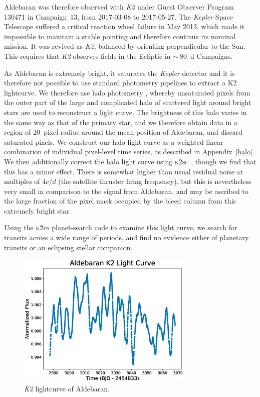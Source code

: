\documentclass[modern]{aastex61}
\newcommand{\kepler}{\emph{Kepler}\xspace}
\newcommand{\ktwo}{\emph{K2}\xspace}
\begin{document}
Aldebaran was therefore observed with \ktwo under Guest Observer Program 130471 in Campaign~13, from 2017-03-08 to 2017-05-27. The \kepler Space Telescope \citep{2010sci...327..977b}  
suffered a critical reaction wheel failure in May 2013, which made it impossible to maintain a stable pointing and therefore continue its nominal mission. It was revived as \ktwo \citep{howell14}, balanced by orienting perpendicular to the Sun. This requires that \ktwo observes fields in the Ecliptic in $\sim~80$~d Campaigns. 

As Aldebaran is extremely bright, it saturates the \kepler detector and it is therefore not possible to use standard photometry pipelines to extract a K2 lightcurve. We therefore use halo photometry \citep[as originally implemented in]{White2017}, whereby unsaturated pixels from the outer part of the large and complicated halo of scattered light around bright stars are used to reconstruct a light curve. The brightness of this halo varies in the same way as that of the primary star, and we therefore obtain data in a region of 20~pixel radius around the mean position of Aldebaran, and discard saturated pixels. We construct our halo light curve as a weighted linear combination of individual pixel-level time series, as described in Appendix~\ref{halo}. We then additionally correct the halo light curve using \textsc{k2sc} \citep{k2sc}, though we find that this has a minor effect. There is somewhat higher than usual residual noise at multiples of $4 c/d$ (the satellite thruster firing frequency), but this is nevertheless very small in comparison to the signal from Aldebaran, and may be ascribed to the large fraction of the pixel mask occupied by the bleed column from this extremely bright star.

Using the \textsc{k2ps} planet-search code \citep{k2ps,Pope2016} to examine this light curve, we search for transits across a wide range of periods, and find no evidence either of planetary transits or an eclipsing stellar companion.

\begin{figure}
\centering
\includegraphics[width=0.75\textwidth]{Aldebaran_lc.eps}
\caption{\ktwo lightcurve of Aldebaran.}
\label{k2_lightcurve}
\end{figure}
\end{document}
